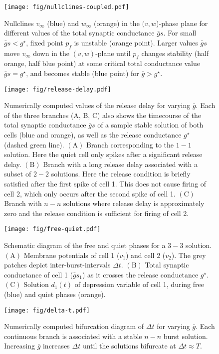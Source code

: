 \documentclass[utf8, draft]{frontiersFPHY} %
\newcommand{\gbar}{\bar g}
\newcommand{\delt}{\Delta t}
\begin{document}
\begin{figure}[h!]
  \centering
  \texttt{[image: fig/nullclines-coupled.pdf]}
  \caption{Nullclines $v_{\infty}$ (blue) and $w_{\infty}$ (orange) in the $(v,w$)-phase plane for different values of the total synaptic conductance $\gbar s$. For small $\gbar s < g^{\star}$, fixed point $p_{f}$ is unstable (orange point). Larger values $\gbar s$ move $v_{\infty}$ down in the $(v,w)$-plane until $p_{f}$ changes stability (half orange,  half blue point) at some critical total conductance value $\gbar s = g^{\star}$, and becomes stable (blue point) for $\gbar>g^{\star}$.~\label{fig:nullclines-coupled}}
\end{figure}

\begin{figure}[h!]
  \centering
  \texttt{[image: fig/release-delay.pdf]}
  \caption{Numerically computed values of the release delay for varying $\gbar$. Each of the three branches (A, B, C) also shows the timecourse of the total synaptic conductance $\gbar s$ of a sample stable solution of both cells (blue and orange), as well as the release conductance $g^{\star}$ (dashed green line). $\bm{\mathrm{(A)}}$ Branch corresponding to the $1-1$ solution. Here the quiet cell only spikes after a significant release delay. $\bm{\mathrm{(B)}}$ Branch with a long release delay associated with a subset of $2-2$ solutions. Here the release condition is briefly satisfied after the first spike of cell 1. This does not cause firing of cell 2, which only occurs after the second spike of cell 1. $\bm{\mathrm{(C)}}$ Branch with $n-n$ solutions  where release delay is approximately zero and the release condition is sufficient for firing of cell 2.
    ~\label{fig:release-delay}}
\end{figure}

\begin{figure}[h!]
  \centering
  \texttt{[image: fig/free-quiet.pdf]}
  \caption{Schematic diagram of the free and quiet phases for a $3-3$ solution. $\bm{\mathrm{(A)}}$ Membrane potentials of cell 1 ($v_{1}$) and cell 2 ($v_{2}$).  The grey patches depict inter-burst-intervals $\delt$. $\bm{\mathrm{(B)}}$ Total synaptic conductance of cell 1 ($\gbar s_1$) as it crosses the release conductance $g^{\star}$. $\bm{\mathrm{(C)}}$ Solution $d_1(t)$ of depression variable of cell 1, during free (blue) and quiet phases (orange).~\label{fig:free-quiet1}}
\end{figure}

\begin{figure}[h!]
  \centering
  \texttt{[image: fig/delta-t.pdf]}
  \caption{Numerically computed bifurcation diagram of $\delt$ for varying $\gbar$. Each continuous branch is associated with a stable $n-n$ burst solution. Increasing $\gbar$ increases $\Delta t$ until the solutions bifurcate at $\Delta t\approx T$.~\label{fig:delta-t}}
\end{figure}
\end{document}
